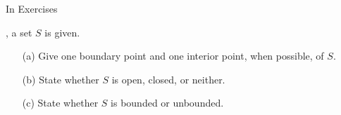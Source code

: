 {\noindent In Exercises}
{, a set $S$ is given.
\begin{enumerate}
\item [(a)] Give one boundary point and one interior point, when possible, of $S$. 
\item	[(b)] State whether $S$ is open, closed, or neither.
\item	[(c)] State whether $S$ is bounded or unbounded.
\end{enumerate}
}
